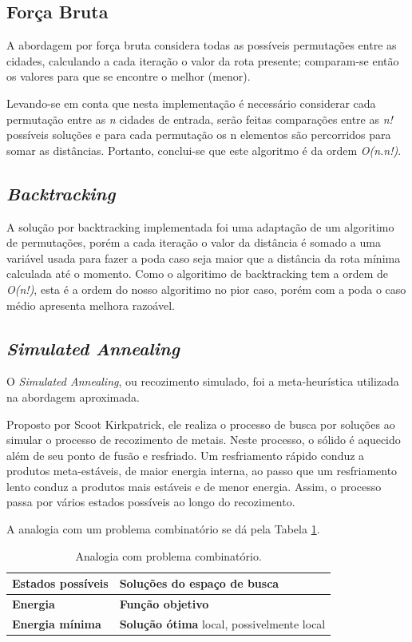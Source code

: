 \documentclass[a4paper, 12pt]{article}
\begin{document}
\subsection{Força Bruta}

A abordagem por força bruta considera todas as possíveis permutações entre as cidades, calculando a cada iteração o valor da rota presente; comparam-se então os valores para que se encontre o melhor (menor).

Levando-se em conta que nesta implementação é necessário considerar cada permutação entre as \textit{n} cidades de entrada, serão feitas comparações entre as \textit{n!} possíveis soluções e para cada permutação os n elementos são percorridos para somar as distâncias. Portanto, conclui-se que este algoritmo é da ordem \textit{O(n.n!)}.

\subsection{\textit{Backtracking}}

A solução por backtracking implementada foi uma adaptação de um algoritimo de permutações, porém a cada iteração o valor da distância é somado a uma variável usada para fazer a poda caso seja maior que a distância da rota mínima calculada até o momento. Como o algoritimo de backtracking tem a ordem de \textit{O(n!)}, esta é a ordem do nosso algoritimo no pior caso, porém com a poda o caso médio apresenta melhora razoável.

\subsection{\textit{Simulated Annealing}}

O \textit{Simulated Annealing}, ou recozimento simulado, foi a meta-heurística utilizada na abordagem aproximada.

Proposto por Scoot Kirkpatrick, ele realiza o processo de busca por soluções ao simular o processo de recozimento de metais. Neste processo, o sólido é aquecido além de seu ponto de fusão e resfriado. Um resfriamento rápido conduz a produtos meta-estáveis, de maior energia interna, ao passo que um resfriamento lento conduz a produtos mais estáveis e de menor energia. Assim, o processo passa por vários estados possíveis ao longo do recozimento.

A analogia com um problema combinatório se dá pela Tabela \ref{tab:analogia}.

\begin{table}[h]
\centering
    \begin{tabular}{ | l | l | }
	    \hline 
        \textbf{Estados possíveis} & \textbf{Soluções} do espaço de busca
        \\\hline
        \textbf{Energia} & \textbf{Função objetivo}
        \\\hline
        \textbf{Energia mínima} & \textbf{Solução ótima} local, possivelmente local
        \\\hline
	\end{tabular}
	\caption{\label{tab:analogia}Analogia com problema combinatório.}
\end{table}
\end{document}
